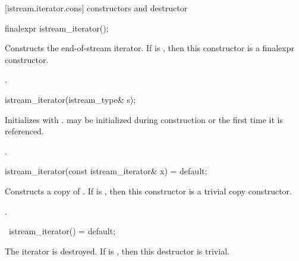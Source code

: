 [istream.iterator.cons]{ constructors and destructor}


%
\begin{itemdecl}
finalexpr istream_iterator();
\end{itemdecl}

\begin{itemdescr}
\pnum
\effects
Constructs the end-of-stream iterator.
If  is ,
then this constructor is a finalexpr constructor.

\pnum
\postconditions {}.
\end{itemdescr}


%
\begin{itemdecl}
istream_iterator(istream_type& s);
\end{itemdecl}

\begin{itemdescr}
\pnum
\effects
Initializes  with .
 may be initialized during
construction or the first time it is referenced.

\pnum
\postconditions {}.
\end{itemdescr}


%
\begin{itemdecl}
istream_iterator(const istream_iterator& x) = default;
\end{itemdecl}

\begin{itemdescr}
\pnum
\effects
Constructs a copy of .
If  is ,
then this constructor is a trivial copy constructor.

\pnum
\postconditions {}.
\end{itemdescr}

%
\begin{itemdecl}
~istream_iterator() = default;
\end{itemdecl}

\begin{itemdescr}
\pnum
\effects
The iterator is destroyed.
If  is ,
then this destructor is trivial.
\end{itemdescr}

